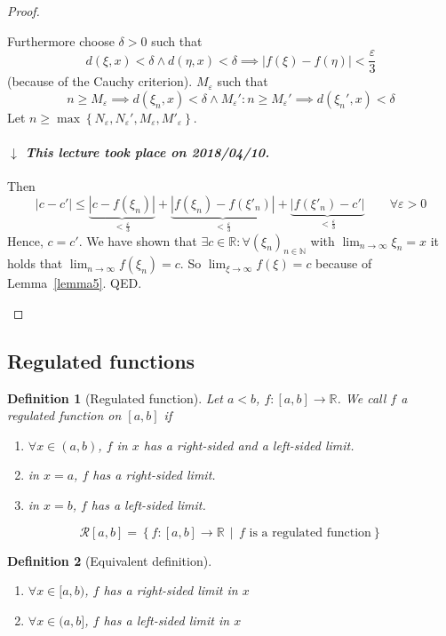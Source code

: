 \documentclass{article}
\newtheorem{definition}{Definition}  \numberwithin{definition}{section}
\newcommand{\set}[1]{\left\{#1\right\}}
\newcommand{\setdef}[2]{\left\{\left.#1\,\middle|\,#2\right.\right\}}
\newcommand{\card}[1]{\left|#1\right|}
\newcommand{\dateref}[1]{%
  \begin{mdframed}[backgroundcolor=gray!10,innerbottommargin=0pt,innertopmargin=0pt]
    \paragraph{\textit{$\downarrow$ This lecture took place on #1.}}%
  \end{mdframed}%
}
\begin{document}
\begin{proof}
\begin{description}
\begin{description}
        Furthermore choose $\delta > 0$ such that
        \[ d(\xi, x) < \delta \land d(\eta, x) < \delta \implies \card{f(\xi) - f(\eta)} < \frac{\varepsilon}{3} \]
        (because of the Cauchy criterion).
        $M_{\varepsilon}$ such that 
        \[ n \geq M_{\varepsilon} \implies d(\xi_n, x) < \delta \land M_{\varepsilon}': n \geq M_{\varepsilon}' \implies d(\xi_n', x) < \delta \]
        Let $n \geq \max\set{N_{\varepsilon}, N_{\varepsilon}', M_{\varepsilon}, M'_{\varepsilon}}$.

        \dateref{2018/04/10}

        Then
        \[ \card{c - c'} \leq \underbrace{\card{c - f(\xi_n)}}_{< \frac\varepsilon3} + \underbrace{\card{f(\xi_n) - f(\xi'_n)}}_{< \frac\varepsilon3} + \underbrace{\card{f(\xi'_n) - c'}}_{< \frac\varepsilon3} \qquad \forall \varepsilon > 0 \]
        Hence, $c = c'$.
        We have shown that $\exists c \in \mathbb R: \forall (\xi_n)_{n \in \mathbb N}$ with $\lim_{n\to\infty} \xi_n = x$ it holds that
        $\lim_{n\to\infty} f(\xi_n) = c$. So $\lim_{\xi\to\infty} f(\xi) = c$ because of Lemma~\ref{lemma5}. QED.
      \end{description}
  \end{description}
\end{proof}

\subsection{Regulated functions}

\begin{definition}[Regulated function] %
  Let $a < b$, $f: [a,b] \to \mathbb R$. We call $f$ a \emph{regulated function on $[a,b]$} if
  \begin{enumerate}
    \item $\forall x \in (a,b)$, $f$ in $x$ has a right-sided and a left-sided limit.
    \item in $x = a$, $f$ has a right-sided limit.
    \item in $x = b$, $f$ has a left-sided limit.
  \end{enumerate}
  \[ \mathcal R[a,b] = \setdef{f: [a,b] \to \mathbb R}{f \text{ is a regulated function}} \]
\end{definition}

\begin{definition}[Equivalent definition] \hfill{}
  \begin{enumerate}
    \item $\forall x \in [a,b)$, $f$ has a right-sided limit in $x$
    \item $\forall x \in (a,b]$, $f$ has a left-sided limit in $x$
  \end{enumerate}
\end{definition}
\end{document}
